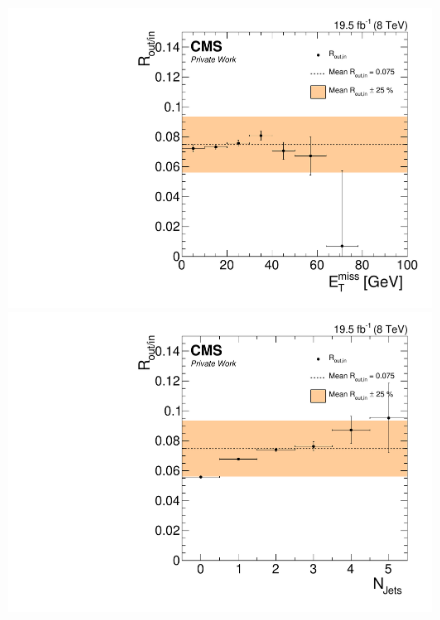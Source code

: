 \begin{figure}[htbp]
\centering
\begin{minipage}[t]{0.49\textwidth}
  \includegraphics[width=\textwidth]{plots/BG/rOutIn/rOutInSyst_DrellYanControlCentral_Full2012_MET_LowMass_MM_None.pdf}
\end{minipage}
\begin{minipage}[t]{0.49\textwidth}
\includegraphics[width=\textwidth]{plots/BG/rOutIn/rOutInSyst_DrellYanControlCentral_Full2012_NJets_LowMass_MM_None.pdf}
\end{minipage}
\begin{minipage}[t]{0.49\textwidth}

\end{minipage}
\end{figure}

